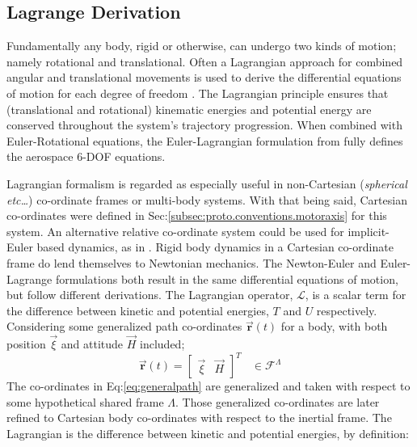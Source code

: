 \subsection{Lagrange Derivation}
\label{subsec:dynamics.rigidbody.lagrange}
Fundamentally any body, rigid or otherwise, can undergo two kinds of motion; namely rotational and translational. Often a Lagrangian approach for combined angular and translational movements is used to derive the differential equations of motion for each degree of freedom \cite{classicaldynamics,rotationrigidbody}. The Lagrangian principle ensures that (translational and rotational) kinematic energies and potential energy are conserved throughout the system's trajectory progression. When combined with Euler-Rotational equations, the Euler-Lagrangian formulation from \cite{lagrange-formalism} fully defines the aerospace 6-DOF equations.
\par
Lagrangian formalism is regarded as especially useful in non-Cartesian (\emph{spherical etc\ldots}) co-ordinate frames or multi-body systems. With that being said, Cartesian co-ordinates were defined in Sec:\ref{subsec:proto.conventions.motoraxis} for this system. An alternative relative co-ordinate system could be used for implicit-Euler based dynamics, as in \cite{autonomousrobotseuler}.
Rigid body dynamics in a Cartesian co-ordinate frame do lend themselves to Newtonian mechanics. The Newton-Euler and Euler-Lagrange formulations both result in the same differential equations of motion, but follow different derivations. The Lagrangian operator, $\mathcal{L}$, is a scalar term for the difference between kinetic and potential energies, $T$ and $U$ respectively. Considering some generalized path co-ordinates $\vec{\mathbf{r}}(t)$ for a body, with both position $\vec{\xi}$ and attitude $\vec{H}$ included;
\begin{equation}\label{eq:generalpath}
\vec{\mathbf{r}}(t)=\begin{bmatrix}
\vec{\xi} & \vec{H}
\end{bmatrix}^T~~~~\in\mathcal{F}^{\Lambda}
\end{equation}
The co-ordinates in Eq:\ref{eq:generalpath} are generalized and taken with respect to some hypothetical shared frame $\Lambda$. Those generalized co-ordinates are later refined to Cartesian body co-ordinates with respect to the inertial frame. The Lagrangian is the difference between kinetic and potential energies, by definition:

